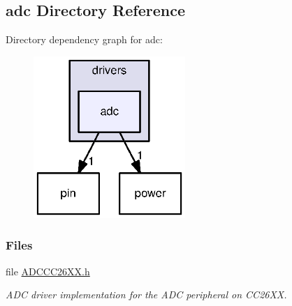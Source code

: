 \subsection{adc Directory Reference}
\label{dir_c6a3cba4ec5fb6d49bf43c9e823f1b41}
Directory dependency graph for adc\+:
\nopagebreak
\begin{figure}[H]
\begin{center}
\leavevmode
\includegraphics[width=163pt]{dir_c6a3cba4ec5fb6d49bf43c9e823f1b41_dep}
\end{center}
\end{figure}
\subsubsection*{Files}
\begin{DoxyCompactItemize}
\item 
file \hyperlink{_a_d_c_c_c26_x_x_8h}{A\+D\+C\+C\+C26\+X\+X.\+h}
\begin{DoxyCompactList}\small\item\em A\+D\+C driver implementation for the A\+D\+C peripheral on C\+C26\+X\+X. \end{DoxyCompactList}\end{DoxyCompactItemize}
